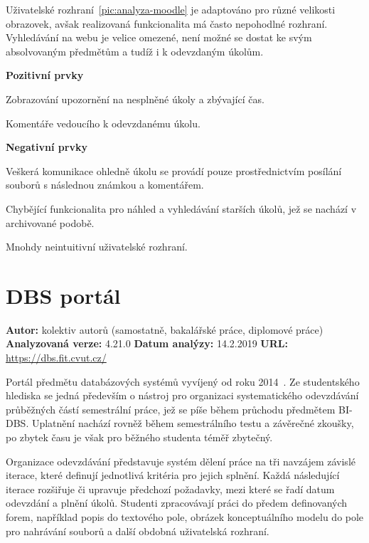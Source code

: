 Uživatelské rozhraní~\ref{pic:analyza-moodle} je adaptováno pro různé velikosti obrazovek, avšak realizovaná funkcionalita má často nepohodlné rozhraní. Vyhledávání na webu je velice omezené, není možné se dostat ke svým absolvovaným předmětům a tudíž i k odevzdaným úkolům.

\textbf{Pozitivní prvky}
\begin{ul}
   \item Zobrazování upozornění na nesplněné úkoly a zbývající čas.
   \item Komentáře vedoucího k odevzdanému úkolu.
\end{ul}

\textbf{Negativní prvky}
\begin{ul}
   \item Veškerá komunikace ohledně úkolu se provádí pouze prostřednictvím posílání souborů s následnou známkou a komentářem.
   \item Chybějící funkcionalita pro náhled a vyhledávání starších úkolů, jež se nachází v archivované podobě.
   \item Mnohdy neintuitivní uživatelské rozhraní.
\end{ul}




\section{DBS portál}

\textbf{Autor:} kolektiv autorů (samostatně, bakalářské práce, diplomové práce)\newline
\textbf{Analyzovaná verze:} 4.21.0\newline
\textbf{Datum analýzy:} 14.2.2019\newline
\textbf{URL:} \url{https://dbs.fit.cvut.cz/}

Portál předmětu databázových systémů vyvíjený od roku 2014~\cite{dbsAuthors}. Ze studentského hlediska se jedná především o nástroj pro organizaci systematického odevzdávání průběžných částí semestrální práce, jež se píše během průchodu předmětem BI-DBS. Uplatnění nachází rovněž během semestrálního testu a závěrečné zkoušky, po zbytek času je však pro běžného studenta téměř zbytečný.

Organizace odevzdávání představuje systém dělení práce na tři navzájem závislé iterace, které definují jednotlivá kritéria pro jejich splnění. Každá následující iterace rozšiřuje či upravuje předchozí požadavky, mezi které se řadí datum odevzdání a plnění úkolů. Studenti zpracovávají práci do předem definovaných forem, například popis do textového pole, obrázek konceptuálního modelu do pole pro nahrávání souborů a další obdobná uživatelská rozhraní.

